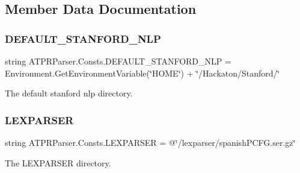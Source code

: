 \subsection{Member Data Documentation}
\hypertarget{class_a_t_p_r_parser_1_1_consts_a2a255a7847f7123ddac4b35f829f8ad5}{}\label{class_a_t_p_r_parser_1_1_consts_a2a255a7847f7123ddac4b35f829f8ad5} 
\subsubsection{\texorpdfstring{D\+E\+F\+A\+U\+L\+T\+\_\+\+S\+T\+A\+N\+F\+O\+R\+D\+\_\+\+N\+LP}{DEFAULT\_STANFORD\_NLP}}
{\footnotesize\ttfamily string A\+T\+P\+R\+Parser.\+Consts.\+D\+E\+F\+A\+U\+L\+T\+\_\+\+S\+T\+A\+N\+F\+O\+R\+D\+\_\+\+N\+LP = Environment.\+Get\+Environment\+Variable(\char`\"{}H\+O\+ME\char`\"{}) + \char`\"{}/Hackaton/Stanford/\char`\"{}\hspace{0.3cm}{\ttfamily [static]}}



The default stanford nlp directory. 

\hypertarget{class_a_t_p_r_parser_1_1_consts_ab61b6ffd61033d649b5eed2c68fd253c}{}\label{class_a_t_p_r_parser_1_1_consts_ab61b6ffd61033d649b5eed2c68fd253c} 
\subsubsection{\texorpdfstring{L\+E\+X\+P\+A\+R\+S\+ER}{LEXPARSER}}
{\footnotesize\ttfamily string A\+T\+P\+R\+Parser.\+Consts.\+L\+E\+X\+P\+A\+R\+S\+ER = @\char`\"{}/lexparser/spanish\+P\+C\+F\+G.\+ser.\+gz\char`\"{}\hspace{0.3cm}{\ttfamily [static]}}



The L\+E\+X\+P\+A\+R\+S\+ER directory. 

\hypertarget{class_a_t_p_r_parser_1_1_consts_af9e34e76e089c4884245fd4a79c09e2c}{}\label{class_a_t_p_r_parser_1_1_consts_af9e34e76e089c4884245fd4a79c09e2c} 
